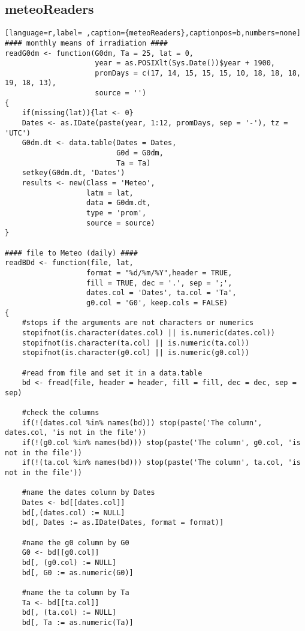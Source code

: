 \subsection{meteoReaders}
\label{sec:org213996e}
\label{subsec:meteoreaders}
\begin{lstlisting}[language=r,label= ,caption={meteoReaders},captionpos=b,numbers=none]
#### monthly means of irradiation ####
readG0dm <- function(G0dm, Ta = 25, lat = 0,
                     year = as.POSIXlt(Sys.Date())$year + 1900,
                     promDays = c(17, 14, 15, 15, 15, 10, 18, 18, 18, 19, 18, 13),
                     source = '')
{
    if(missing(lat)){lat <- 0}
    Dates <- as.IDate(paste(year, 1:12, promDays, sep = '-'), tz = 'UTC')
    G0dm.dt <- data.table(Dates = Dates,
                          G0d = G0dm,
                          Ta = Ta)
    setkey(G0dm.dt, 'Dates')
    results <- new(Class = 'Meteo',
                   latm = lat,
                   data = G0dm.dt,
                   type = 'prom',
                   source = source)
}

#### file to Meteo (daily) ####
readBDd <- function(file, lat,
                   format = "%d/%m/%Y",header = TRUE,
                   fill = TRUE, dec = '.', sep = ';',
                   dates.col = 'Dates', ta.col = 'Ta',
                   g0.col = 'G0', keep.cols = FALSE)
{
    #stops if the arguments are not characters or numerics
    stopifnot(is.character(dates.col) || is.numeric(dates.col))
    stopifnot(is.character(ta.col) || is.numeric(ta.col))
    stopifnot(is.character(g0.col) || is.numeric(g0.col))

    #read from file and set it in a data.table
    bd <- fread(file, header = header, fill = fill, dec = dec, sep = sep)

    #check the columns
    if(!(dates.col %in% names(bd))) stop(paste('The column', dates.col, 'is not in the file'))
    if(!(g0.col %in% names(bd))) stop(paste('The column', g0.col, 'is not in the file'))
    if(!(ta.col %in% names(bd))) stop(paste('The column', ta.col, 'is not in the file'))

    #name the dates column by Dates
    Dates <- bd[[dates.col]]
    bd[,(dates.col) := NULL]
    bd[, Dates := as.IDate(Dates, format = format)]

    #name the g0 column by G0
    G0 <- bd[[g0.col]]
    bd[, (g0.col) := NULL]
    bd[, G0 := as.numeric(G0)]

    #name the ta column by Ta
    Ta <- bd[[ta.col]]
    bd[, (ta.col) := NULL]
    bd[, Ta := as.numeric(Ta)]


\end{lstlisting}
